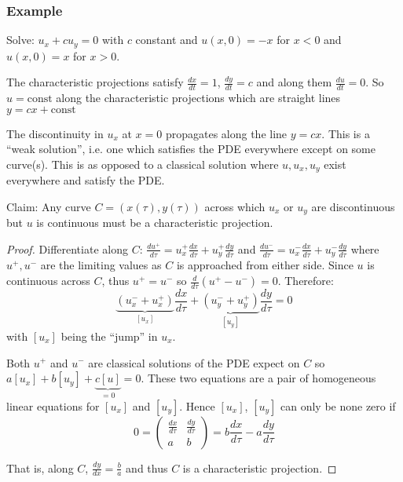 \subsubsection*{Example}

Solve: $u_x + cu_y = 0$ with $c$ constant and $u(x,0) = -x$ for $x<0$ and $u(x,0) = x$ for $x>0$.

\vspace{\baselineskip}

The characteristic projections satisfy $\frac{dx}{dt} = 1$, $\frac{dy}{dt} = c$ and along them $\frac{du}{dt} = 0$. So $u = \text{const}$ along the characteristic projections which are straight lines $y=cx + \text{const}$

The discontinuity in $u_x$ at $x=0$ propagates along the line $y=cx$. This is a ``weak solution'', i.e. one which satisfies the PDE everywhere except on some curve(s). This is as opposed to a classical solution where $u, u_x, u_y$ exist everywhere and satisfy the PDE.

Claim: Any curve $C = (x(\tau), y(\tau))$ across which $u_x$ or $u_y$ are discontinuous but $u$ is continuous must be a characteristic projection.

\begin{proof}

Differentiate along $C$: $\frac{du^{+}}{d\tau} = u_x^{+} \frac{dx}{d\tau} + u_y^{+} \frac{dy}{d\tau}$ and $\frac{du^{-}}{d\tau} = u_x^{-} \frac{dx}{d\tau} + u_y^{-} \frac{dy}{d\tau}$ where $u^+, u^-$ are the limiting values as $C$ is approached from either side. Since $u$ is continuous across $C$, thus $u^+ = u^-$ so $\frac{d}{d\tau} (u^+ - u^-) = 0$. Therefore: $$\underbrace{(u^-_x + u^+_x)}_{[u_x]} \frac{dx}{d\tau} + \underbrace{(u^-_y + u^+_y)}_{[u_y]} \frac{dy}{d\tau} = 0$$ with $[u_x]$ being the ``jump'' in $u_x$.

Both $u^+$ and $u^-$ are classical solutions of the PDE expect on $C$ so $a[u_x] + b[u_y] + \underbrace{c[u]}_{=0} = 0$. These two equations are a pair of homogeneous linear equations for $[u_x]$ and $[u_y]$. Hence $[u_x]$, $[u_y]$ can only be none zero if $$0 = \begin{pmatrix} \frac{dx}{d\tau} & \frac{dy}{d\tau} \\ a & b \end{pmatrix} = b \frac{dx}{d\tau} - a \frac{dy}{d\tau}$$

That is, along $C$, $\frac{dy}{dx} = \frac{b}{a}$ and thus $C$ is a characteristic projection.

\end{proof} 